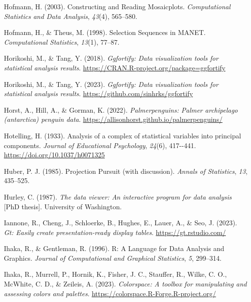 \documentclass[
  letterpaper,
]{krantz}
\newlength{\cslhangindent}
\newenvironment{CSLReferences}[2] %
 {\begin{list}{}{%
  \setlength{\itemindent}{0pt}
  \setlength{\leftmargin}{0pt}
  \setlength{\parsep}{0pt}
  \ifodd #1
   \setlength{\leftmargin}{\cslhangindent}
   \setlength{\itemindent}{-1\cslhangindent}
  \fi
  \setlength{\itemsep}{#2\baselineskip}}}
 {\end{list}}
\begin{document}
\begin{CSLReferences}{1}{0}
Hofmann, H. (2003). Constructing and {R}eading {M}osaicplots.
\emph{Computational Statistics and Data Analysis}, \emph{43}(4),
565--580.

Hofmann, H., \& Theus, M. (1998). Selection {S}equences in {MANET}.
\emph{Computational Statistics}, \emph{13}(1), 77--87.

Horikoshi, M., \& Tang, Y. (2018). \emph{Ggfortify: Data visualization
tools for statistical analysis results}.
\url{https://CRAN.R-project.org/package=ggfortify}

Horikoshi, M., \& Tang, Y. (2023). \emph{Ggfortify: Data visualization
tools for statistical analysis results}.
\url{https://github.com/sinhrks/ggfortify}

Horst, A., Hill, A., \& Gorman, K. (2022). \emph{Palmerpenguins: Palmer
archipelago (antarctica) penguin data}.
\url{https://allisonhorst.github.io/palmerpenguins/}

Hotelling, H. (1933). Analysis of a complex of statistical variables
into principal components. \emph{Journal of Educational Psychology},
\emph{24}(6), 417-\/-441. \url{https://doi.org/10.1037/h0071325}

Huber, P. J. (1985). {P}rojection {P}ursuit (with discussion).
\emph{Annals of Statistics}, \emph{13}, 435--525.

Hurley, C. (1987). \emph{The data viewer: An interactive program for
data analysis} {[}PhD thesis{]}. University of Washington.

Iannone, R., Cheng, J., Schloerke, B., Hughes, E., Lauer, A., \& Seo, J.
(2023). \emph{Gt: Easily create presentation-ready display tables}.
\url{https://gt.rstudio.com/}

Ihaka, R., \& Gentleman, R. (1996). R: {A} {L}anguage for {D}ata
{A}nalysis and {G}raphics. \emph{Journal of Computational and Graphical
Statistics}, \emph{5}, 299--314.

Ihaka, R., Murrell, P., Hornik, K., Fisher, J. C., Stauffer, R., Wilke,
C. O., McWhite, C. D., \& Zeileis, A. (2023). \emph{Colorspace: A
toolbox for manipulating and assessing colors and palettes}.
\url{https://colorspace.R-Forge.R-project.org/}


\end{CSLReferences}
\end{document}
